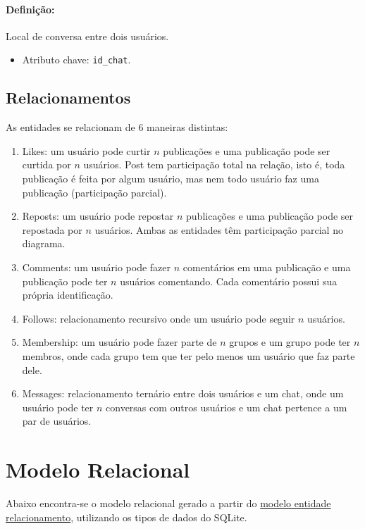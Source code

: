 \documentclass{article}
\begin{document}
\paragraph{Definição:} Local de conversa entre dois usuários.
\begin{itemize}
        \item Atributo chave: \verb|id_chat|.
\end{itemize}

\subsection{Relacionamentos}
As entidades se relacionam de 6 maneiras distintas:
\begin{enumerate}
        \item Likes: um usuário pode curtir $n$ publicações e uma publicação pode ser curtida por $n$ usuários. Post tem participação total na relação, isto é, toda publicação é feita por algum usuário, mas nem todo usuário faz uma publicação (participação parcial).
        \item Reposts: um usuário pode repostar $n$ publicações e uma publicação pode ser repostada por $n$ usuários. Ambas as entidades têm participação parcial no diagrama.
        \item Comments: um usuário pode fazer $n$ comentários em uma publicação e uma publicação pode ter $n$ usuários comentando. Cada comentário possui sua própria identificação.
        \item Follows: relacionamento recursivo onde um usuário pode seguir $n$ usuários.
        \item Membership: um usuário pode fazer parte de $n$ grupos e um grupo pode ter $n$ membros, onde cada grupo tem que ter pelo menos um usuário que faz parte dele.
        \item Messages: relacionamento ternário entre dois usuários e um chat, onde um usuário pode ter $n$ conversas com outros usuários e um chat pertence a um par de usuários.
\end{enumerate}

\section{Modelo Relacional}
Abaixo encontra-se o modelo relacional gerado a partir do \hyperref[sec:mer]{modelo entidade relacionamento}, utilizando os tipos de dados do SQLite.
\end{document}

